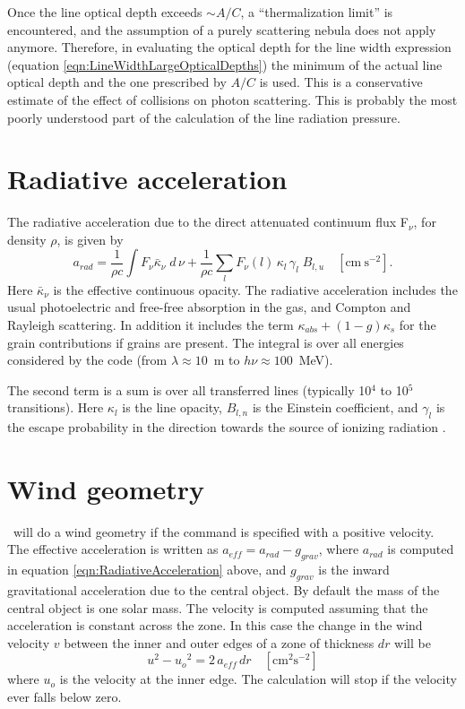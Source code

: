 Once the line optical depth exceeds $\sim A/C$, a ``thermalization limit''
is encountered, and the assumption of a purely scattering nebula does not
apply anymore.  Therefore, in evaluating the optical depth for the line
width expression (equation \ref{eqn:LineWidthLargeOpticalDepths}) the minimum of the actual line optical depth
and the one prescribed by $A/C$ is used. This is a conservative estimate of
the effect of collisions on photon scattering.  This is probably the most
poorly understood part of the calculation of the line radiation pressure.

\section{Radiative acceleration}

The radiative acceleration due to the direct attenuated continuum flux
F$_\nu$, for density $\rho$, is given by
\begin{equation}
\label{eqn:RadiativeAcceleration}
{a_{rad}} = \frac{1}{{\rho c}}\int {{F_\nu }{{\bar \kappa }_\nu }\;d\,\nu
+ } \frac{1}{{\rho c}}\sum\limits_l {{F_\nu }(l)\,{\kappa _l}\,{\gamma _l}}
\;{B_{l,u}}
\quad  [\mathrm{cm~s}^{-2}].
\end{equation}
Here ${\bar \kappa _\nu }$
is the effective continuous opacity.  The radiative acceleration includes
the usual photoelectric and free-free absorption in the gas, and Compton
and Rayleigh scattering.  In addition it includes the term $\kappa_{abs} +
(1-g)\kappa_s$
for the grain contributions if grains are present.  The integral is over
all energies considered by the code (from  $\lambda \approx 10$~m to $h\nu
\approx 100$~MeV).

The second term is a sum is over all transferred lines (typically 10$^4$
to 10$^5$ transitions).  Here $\kappa_l$ is the line opacity, $B_{l,n}$ is the Einstein
coefficient, and $\gamma_l$ is the escape probability in the direction towards the
source of ionizing radiation \citep{Ferland1988}.

\section{Wind geometry}

\Cloudy\ will do a wind geometry if the  command
is specified with a positive velocity.  The effective acceleration is written
as $a_{eff} = a_{rad} - g_{grav}$, where $a_{rad}$ is computed in equation
\ref{eqn:RadiativeAcceleration} above, and
$g_{grav}$ is the inward gravitational acceleration due to the central object.
By default the mass of the central object is one solar mass.  The velocity
is computed assuming that the acceleration is constant across the zone.
In this case the change in the wind velocity $v$ between the inner and outer
edges of a zone of thickness $dr$ will be
\begin{equation}
{u^2} - {u_o}^2 = 2\,{a_{eff}}\,dr
\quad [\mathrm{cm}^2 \mathrm{s}^{-2}]
\end{equation}
where $u_o$ is the velocity at the inner edge.  The calculation will stop if
the velocity ever falls below zero.

